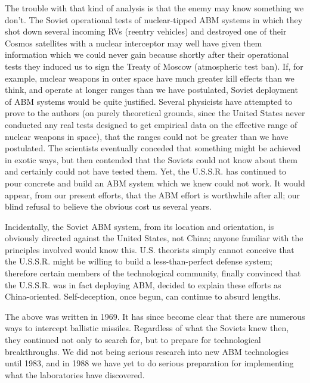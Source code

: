 The trouble with that kind of analysis is that the enemy may know something we don't. The Soviet operational tests of nuclear-tipped ABM systems in which they shot down several incoming RVs (reentry vehicles) and destroyed one of their Cosmos satellites with a nuclear interceptor may well have given them information which we could never gain because shortly after their operational tests they induced us to sign the Treaty of Moscow (atmospheric test ban). If, for example, nuclear weapons in outer space have much greater kill effects than we think, and operate at longer ranges than we have postulated, Soviet deployment of ABM systems would be quite justified. Several physicists have attempted to prove to the authors (on purely theoretical grounds, since the United States never conducted any real tests designed to get empirical data on the effective range of nuclear weapons in space), that the ranges could not be greater than we have postulated. The scientists eventually conceded that something might be achieved in exotic ways, but then contended that the Soviets could not know about them and certainly could not have tested them. Yet, the U.S.S.R. has continued to pour concrete and build an ABM system which we knew could not work. It would appear, from our present efforts, that the ABM effort is worthwhile after all; our blind refusal to believe the obvious cost us several years.

Incidentally, the Soviet ABM system, from its location and orientation, is obviously directed against the United States, not China; anyone familiar with the principles involved would know this. U.S. theorists simply cannot conceive that the U.S.S.R. might be willing to build a less-than-perfect defense system; therefore certain members of the technological community, finally convinced that the U.S.S.R. was in fact deploying ABM, decided to explain these efforts as China-oriented. Self-deception, once begun, can continue to absurd lengths.

\begin{mdframed}[backgroundcolor=black!10]
The above was written in 1969. It has since become clear that there are numerous ways to intercept ballistic missiles. Regardless of what the Soviets knew then, they continued not only to search for, but to prepare for technological breakthroughs. We did not being serious research into new ABM technologies until 1983, and in 1988 we have yet to do serious preparation for implementing what the laboratories have discovered.
\end{mdframed}

